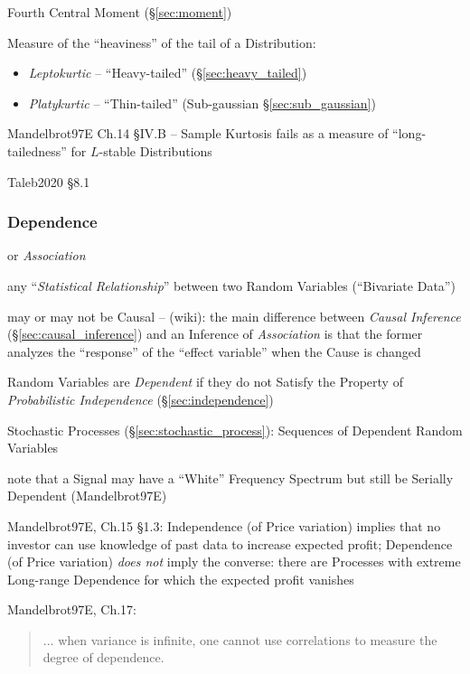 Fourth Central Moment (\S\ref{sec:moment})

Measure of the ``heaviness'' of the tail of a Distribution:

\begin{itemize}
  \item \emph{Leptokurtic} -- ``Heavy-tailed'' (\S\ref{sec:heavy_tailed})
  \item \emph{Platykurtic} -- ``Thin-tailed'' (Sub-gaussian
    \S\ref{sec:sub_gaussian})
\end{itemize}

Mandelbrot97E Ch.14 \S IV.B -- Sample Kurtosis fails as a measure of
``long-tailedness'' for $L$-stable Distributions

Taleb2020 \S 8.1



\subsubsection{Dependence}\label{sec:dependence}

or \emph{Association}

any ``\emph{Statistical Relationship}'' between two Random Variables
(``Bivariate Data'')

may or may not be Causal -- (wiki): the main difference between
\emph{Causal Inference} (\S\ref{sec:causal_inference}) and an Inference of
\emph{Association} is that the former analyzes the ``response'' of the ``effect
variable'' when the Cause is changed

Random Variables are \emph{Dependent} if they do not Satisfy the Property of
\emph{Probabilistic Independence} (\S\ref{sec:independence})

Stochastic Processes (\S\ref{sec:stochastic_process}): Sequences of Dependent
Random Variables

note that a Signal may have a ``White'' Frequency Spectrum but still be Serially
Dependent (Mandelbrot97E)

Mandelbrot97E, Ch.15 \S 1.3: Independence (of Price variation) implies that no
investor can use knowledge of past data to increase expected profit; Dependence
(of Price variation) \emph{does not} imply the converse: there are Processes
with extreme Long-range Dependence for which the expected profit vanishes

Mandelbrot97E, Ch.17:
\begin{quote}
  ... when variance is infinite, one cannot use correlations to measure the
  degree of dependence.
\end{quote}

